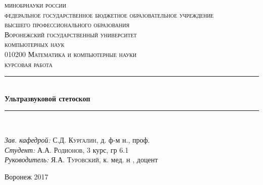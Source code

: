 \begin{titlepage}

\newcommand{\HRule}{\rule{\linewidth}{0.5mm}} %

\center %
 
\textsc {
\footnotesize{
минобрнауки россии\\
федеральное государственное бюджетное образовательное учреждение\\
высшего профессионального образования}\\
\large{Воронежский государственный университет}
}\\[1.0cm] %


\textsc{ компьютерных наук}\\ %
\textsc{\footnotesize010200 Математика и компьютерные науки}\\[1.0cm] 
\textsc{\Large курсовая работа}\\[0.5cm] %



\HRule \\[0.4cm]
{ \huge \bfseries Ультразвуковой стетоскоп}\\[0.4cm] %
\HRule \\[1.5cm]
 


\begin{flushleft} \large
\emph{Зав. кафедрой:} С.Д. \textsc{Кургалин}, д. ф-м н., проф.\\
\emph{Студент:} А.А. \textsc{Родионов}, 3 курс, гр 6.1 \\ %
\emph{Руководитель:} Я.А. \textsc{Туровский}, к. мед. н , доцент %
\end{flushleft}



\vfill %
\begin{center}
Воронеж 2017
\end{center}
\end{titlepage}

